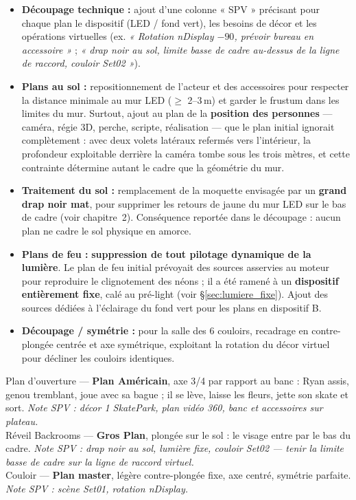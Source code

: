 \documentclass[11pt,a4paper]{report}
\begin{document}
\begin{itemize}
\item \textbf{Découpage technique :} ajout d'une colonne « SPV » précisant pour chaque plan le dispositif (LED / fond vert), les besoins de décor et les opérations virtuelles (ex. \emph{« Rotation nDisplay $-90$\textdegree, prévoir bureau en accessoire »} ; \emph{« drap noir au sol, limite basse de cadre au-dessus de la ligne de raccord, couloir Set02 »}).
\item \textbf{Plans au sol :} repositionnement de l'acteur et des accessoires pour respecter la distance minimale au mur LED ($\geq$ 2--3\,m) et garder le frustum dans les limites du mur. Surtout, ajout au plan de la \textbf{position des personnes} --- caméra, régie 3D, perche, scripte, réalisation --- que le plan initial ignorait complètement : avec deux volets latéraux refermés vers l'intérieur, la profondeur exploitable derrière la caméra tombe sous les trois mètres, et cette contrainte détermine autant le cadre que la géométrie du mur.
\item \textbf{Traitement du sol :} remplacement de la moquette envisagée par un \textbf{grand drap noir mat}, pour supprimer les retours de jaune du mur LED sur le bas de cadre (voir chapitre~2). Conséquence reportée dans le découpage : aucun plan ne cadre le sol physique en amorce.
\item \textbf{Plans de feu :} \textbf{suppression de tout pilotage dynamique de la lumière}. Le plan de feu initial prévoyait des sources asservies au moteur pour reproduire le clignotement des néons ; il a été ramené à un \textbf{dispositif entièrement fixe}, calé au pré-light (voir §\ref{sec:lumiere_fixe}). Ajout des sources dédiées à l'éclairage du fond vert pour les plans en dispositif B.
\item \textbf{Découpage / symétrie :} pour la salle des 6 couloirs, recadrage en contre-plongée centrée et axe symétrique, exploitant la rotation du décor virtuel pour décliner les couloirs identiques.
\end{itemize}

\begin{notebox}[title={Extrait du découpage technique (plans fixes)}]
\footnotesize
Plan d'ouverture --- \textbf{Plan Américain}, axe 3/4 par rapport au banc : Ryan assis, genou tremblant, joue avec sa bague ; il se lève, laisse les fleurs, jette son skate et sort. \emph{Note SPV : décor 1 SkatePark, plan vidéo 360, banc et accessoires sur plateau.} \\[4pt]
Réveil Backrooms --- \textbf{Gros Plan}, plongée sur le sol : le visage entre par le bas du cadre. \emph{Note SPV : drap noir au sol, lumière fixe, couloir Set02 --- tenir la limite basse de cadre sur la ligne de raccord virtuel.} \\[4pt]
Couloir --- \textbf{Plan master}, légère contre-plongée fixe, axe centré, symétrie parfaite. \emph{Note SPV : scène Set01, rotation nDisplay.}
\end{notebox}
\end{document}
